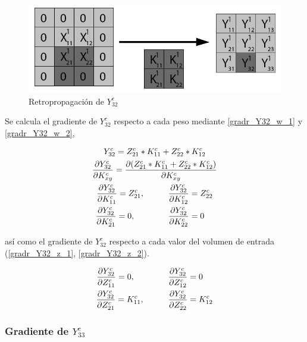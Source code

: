 \begin{figure}[H]
	\centering
	\includegraphics[width=0.8\linewidth]{imagenes/conv_back_padding_8.jpg} 
	\caption{Retropropagación de $Y^c_{32}$}
\end{figure}

Se calcula el gradiente de $Y^c_{32}$ respecto a cada peso mediante \ref{gradr_Y32_w_1} y \ref{gradr_Y32_w_2},

\begin{gather}
	Y^c_{32} = Z^c_{21} * K^c_{11} + Z^c_{22} * K^c_{12} \\
	\frac{\partial Y^c_{32}}{\partial K^c_{xy}} = \frac{\partial (Z^c_{21} * K^c_{11} + Z^c_{22} * K^c_{12})}{\partial K^c_{xy}} \\
	\frac{\partial Y^c_{32}}{\partial K^c_{11}} = Z^c_{21}, \hspace{10mm} \frac{\partial Y^c_{32}}{\partial K^c_{12}} = Z^c_{22} \label{gradr_Y32_w_1} \\
	\frac{\partial Y^c_{32}}{\partial K^c_{21}} = 0, \hspace{14mm} \frac{\partial Y^c_{32}}{\partial K^c_{22}} = 0 \hspace{4mm} \label{gradr_Y32_w_2}
\end{gather}

así como el gradiente de $Y^c_{32}$ respecto a cada valor del volumen de entrada (\ref{gradr_Y32_z_1}, \ref{gradr_Y32_z_2}).


\begin{gather}
	\frac{\partial Y^c_{32}}{\partial Z^c_{11}} = 0, \hspace{14mm} \frac{\partial Y^c_{32}}{\partial Z^c_{12}} = 0 \hspace{4mm} \label{gradr_Y32_z_1} \\
	\frac{\partial Y^c_{32}}{\partial Z^c_{21}} = K^c_{11}, \hspace{10mm} \frac{\partial Y^c_{32}}{\partial Z^c_{22}} = K^c_{12} \label{gradr_Y32_z_2}
\end{gather}



\subsubsection{Gradiente de $Y^c_{33}$}

